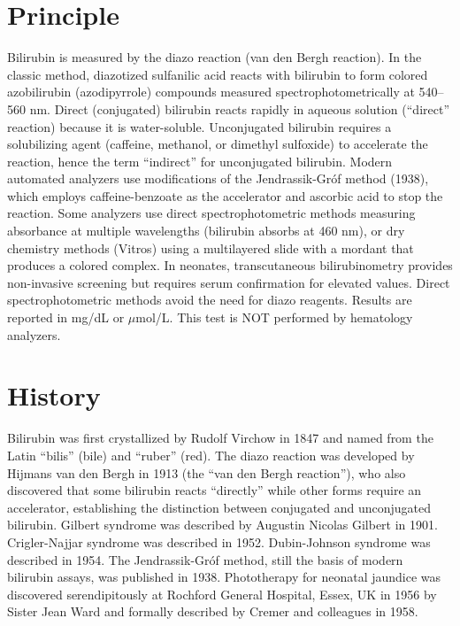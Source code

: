 \section*{Principle}
Bilirubin is measured by the diazo reaction (van den Bergh reaction). In the classic method, diazotized sulfanilic acid reacts with bilirubin to form colored azobilirubin (azodipyrrole) compounds measured spectrophotometrically at 540--560 nm. Direct (conjugated) bilirubin reacts rapidly in aqueous solution (``direct'' reaction) because it is water-soluble. Unconjugated bilirubin requires a solubilizing agent (caffeine, methanol, or dimethyl sulfoxide) to accelerate the reaction, hence the term ``indirect'' for unconjugated bilirubin. Modern automated analyzers use modifications of the Jendrassik-Gr\'{o}f method (1938), which employs caffeine-benzoate as the accelerator and ascorbic acid to stop the reaction. Some analyzers use direct spectrophotometric methods measuring absorbance at multiple wavelengths (bilirubin absorbs at 460 nm), or dry chemistry methods (Vitros) using a multilayered slide with a mordant that produces a colored complex. In neonates, transcutaneous bilirubinometry provides non-invasive screening but requires serum confirmation for elevated values. Direct spectrophotometric methods avoid the need for diazo reagents. Results are reported in mg/dL or $\mu$mol/L. This test is NOT performed by hematology analyzers.

\section*{History}
Bilirubin was first crystallized by Rudolf Virchow in 1847 and named from the Latin ``bilis'' (bile) and ``ruber'' (red). The diazo reaction was developed by Hijmans van den Bergh in 1913 (the ``van den Bergh reaction''), who also discovered that some bilirubin reacts ``directly'' while other forms require an accelerator, establishing the distinction between conjugated and unconjugated bilirubin. Gilbert syndrome was described by Augustin Nicolas Gilbert in 1901. Crigler-Najjar syndrome was described in 1952. Dubin-Johnson syndrome was described in 1954. The Jendrassik-Gr\'{o}f method, still the basis of modern bilirubin assays, was published in 1938. Phototherapy for neonatal jaundice was discovered serendipitously at Rochford General Hospital, Essex, UK in 1956 by Sister Jean Ward and formally described by Cremer and colleagues in 1958.


